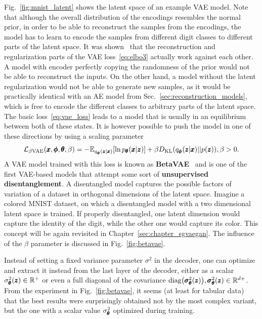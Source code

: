 Fig.~\ref{fig:mnist_latent} shows the latent space of an example VAE model. Note that although the overall distribution of the encodings resembles the normal prior, in order to be able to reconstruct the samples from the encodings, the model has to learn to encode the samples from different digit classes to different parts of the latent space. It was shown~\cite{higgins2017beta} that the reconstruction and regularization parts of the VAE loss~\eqref{eq:elbo3} actually work against each other. A model with encoder perfectly copying the randomness of the prior would not be able to reconstruct the inputs. On the other hand, a model without the latent regularization would not be able to generate new samples, as it would be practically identical with an AE model from Sec.~\ref{sec:reconstruction_models}, which is free to encode the different classes to arbitrary parts of the latent space. The basic loss~\eqref{eq:vae_loss} leads to a model that is usually in an equilibrium between both of these states. It is however possible to push the model in one of these directions by using a scaling parameter
\begin{equation} \label{eq:betavae}
\mathcal{L}_{\beta\text{VAE}}(\vc{x},\vc{\phi},\vc{\theta},\beta)= - \mathbb{E}_{q_{\vc{\phi}}(\vc{z}|\vc{x})}\left[\ln p_{\vc{\theta}}(\vc{x}|\vc{z})\right] + \beta D_{\text{KL}}\left(q_{\vc{\phi}}(\vc{z}|\vc{x})||p(\vc{z})\right),\beta>0.
\end{equation}
A VAE model trained with this loss is known as \textbf{BetaVAE}~\cite{higgins2017beta} and is one of the first VAE-based models that attempt some sort of \textbf{unsupervised disentanglement}. A disentangled model captures the possible factors of variation of a dataset in orthogonal dimensions of the latent space. Imagine a colored MNIST dataset, on which a disentangled model with a two dimensional latent space is trained. If properly disentangled, one latent dimension would capture the identity of the digit, while the other one would capture its color. This concept will be again revisited in Chapter~\ref{sec:chapter_sgvaegan}. The influence of the $\beta$ parameter is discussed in Fig.~\ref{fig:betavae}.

Instead of setting a fixed variance parameter $\sigma^2$ in the decoder, one can optimize and extract it instead from the last layer of the decoder, either as a scalar $\sigma^2_{\pmb{{\theta}}}(\pmb{{z}}) \in \mathbb{R}^+$
or even a full diagonal of the covariance $\text{diag}\left(\vc{\sigma}^2_{\vc{\theta}}(\vc{z})\right),\vc{\sigma}^2_{\vc{\theta}}(\vc{z})\in\mathbb{R}^{d+}$. From the experiment in Fig.~\ref{fig:betavae}, it seems (at least for tabular data) that the best results were surprisingly obtained not by the most complex variant, but the one with a scalar value $\sigma^2_{\pmb{{\theta}}}$ optimized during training.

